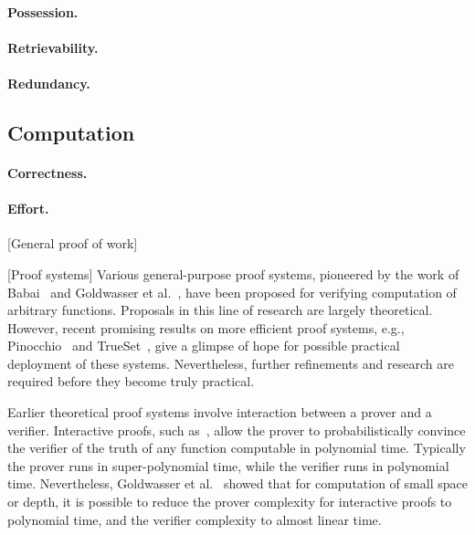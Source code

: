 \paragraph{Possession.}

\paragraph{Retrievability.}

\paragraph{Redundancy.}




\subsection{Computation}

\paragraph{Correctness.}

\paragraph{Effort.}

[General proof of work]

[Proof systems]
Various general-purpose proof systems, pioneered by the work of Babai~\cite{Bab85} and Goldwasser et al.~\cite{GMR89}, have been proposed for verifying computation of arbitrary functions.
Proposals in this line of research are largely theoretical.
However, recent promising results on more efficient proof systems, e.g., Pinocchio~\cite{PHG+13} and TrueSet~\cite{KPP+14}, give a glimpse of hope for possible practical deployment of these systems.
Nevertheless, further refinements and research are required before they become truly practical.

Earlier theoretical proof systems involve interaction between a prover and a verifier.
Interactive proofs, such as~\cite{LFK+92,Sha92}, allow the prover to probabilistically convince the verifier of the truth of any function computable in polynomial time.
Typically the prover runs in super-polynomial time, while the verifier runs in polynomial time.
Nevertheless, Goldwasser et al.~\cite{GKR08} showed that for computation of small space or depth, it is possible to reduce the prover complexity for interactive proofs to polynomial time, and the verifier complexity to almost linear time.  

